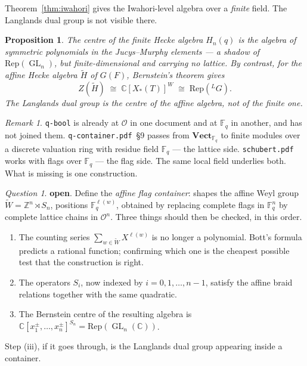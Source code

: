 \documentclass[11pt,a4paper]{article}
\newtheorem{proposition}[theorem]{Proposition}
\theoremstyle{definition}
\theoremstyle{remark}
\newtheorem{remark}[theorem]{Remark}
\newtheorem{question}[theorem]{Question}
\newcommand{\FF}{\mathbb{F}}
\newcommand{\ZZ}{\mathbb{Z}}
\newcommand{\CC}{\mathbb{C}}
\newcommand{\OO}{\mathcal{O}}
\newcommand{\cat}[1]{\mathbf{#1}}
\newcommand{\Vect}{\cat{Vect}}
\newcommand{\Rep}{\mathrm{Rep}}
\newcommand{\dual}[1]{{}^{L}\!#1}
\DeclareMathOperator{\GL}{GL}
\newcommand{\NEW}{\textcolor{openblue}{\textbf{open}}}
\begin{document}
Theorem~\ref{thm:iwahori} gives the Iwahori-level algebra over a \emph{finite}
field. The Langlands dual group is not visible there.

\begin{proposition}\label{prop:centre}
The centre of the finite Hecke algebra $H_n(q)$ is the algebra of symmetric
polynomials in the Jucys--Murphy elements --- a shadow of $\Rep(\GL_n)$, but
finite-dimensional and carrying no lattice. By contrast, for the \emph{affine}
Hecke algebra $\widetilde{H}$ of $G(F)$, Bernstein's theorem gives
\[
  Z(\widetilde{H}) \;\cong\; \CC[X_*(T)]^{W} \;\cong\; \Rep(\dual{G}) .
\]
The Langlands dual group is the centre of the affine algebra, not of the finite
one.
\end{proposition}

\begin{remark}
\texttt{q-bool} is already at $\OO$ in one document and at $\FF_q$ in another,
and has not joined them. \texttt{q-container.pdf}~\S9 passes from
$\Vect_{\FF_q}$ to finite modules over a discrete valuation ring with residue
field $\FF_q$ --- the lattice side. \texttt{schubert.pdf} works with flags over
$\FF_q$ --- the flag side. The same local field underlies both. What is missing
is one construction.
\end{remark}

\begin{question}\label{q:affine}
\NEW. Define the \emph{affine flag container}: shapes the affine Weyl group
$\widetilde{W} = \ZZ^{n} \rtimes S_n$, positions $\FF_q^{\ell(w)}$, obtained by
replacing complete flags in $\FF_q^n$ by complete lattice chains in $\OO^n$.
Three things should then be checked, in this order.
\begin{enumerate}[nosep,label=(\roman*)]
\item The counting series $\sum_{w \in \widetilde{W}} X^{\ell(w)}$ is no longer
a polynomial. Bott's formula predicts a rational function; confirming which one
is the cheapest possible test that the construction is right.
\item The operators $S_i$, now indexed by $i = 0, 1, \dots, n-1$, satisfy the
affine braid relations together with the same quadratic.
\item The Bernstein centre of the resulting algebra is
$\CC[x_1^{\pm},\dots,x_n^{\pm}]^{S_n} = \Rep(\GL_n(\CC))$.
\end{enumerate}
Step (iii), if it goes through, is the Langlands dual group appearing inside a
container.
\end{question}
\end{document}

